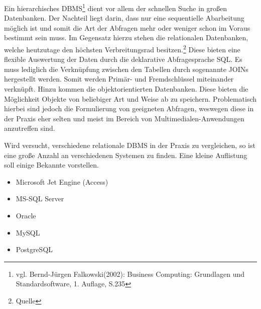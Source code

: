 Ein hierarchisches DBMS\footnote{vgl. Bernd-Jürgen Falkowski(2002): Business Computing: Grundlagen und Standardsoftware, 1. Auflage, S.235} dient vor allem der schnellen Suche in großen Datenbanken.
Der Nachteil liegt darin, dass nur eine sequentielle Abarbeitung möglich ist und somit die Art der Abfragen mehr oder weniger schon im Voraus bestimmt sein muss.
Im Gegensatz hierzu stehen die relationalen Datenbanken, welche heutzutage den höchsten Verbreitungsrad besitzen.\footnote{Quelle}
Diese bieten eine flexible Auswertung der Daten durch die deklarative Abfragesprache SQL.
Es muss lediglich die Verknüpfung zwischen den Tabellen durch sogenannte JOINs hergestellt werden. Somit werden Primär- und Fremdschlüssel miteinander verknüpft.
Hinzu kommen die objektorientierten Datenbanken. Diese bieten die Möglichkeit Objekte von beliebiger Art und Weise ab zu speichern.
Problematisch hierbei sind jedoch die Formulierung von geeigneten Abfragen, weswegen diese in der Praxis eher selten und meist im Bereich von Multimedialen-Anwendungen anzutreffen sind.%

Wird versucht, verschiedene relationale DBMS in der Praxis zu vergleichen, so ist eine große Anzahl an verschiedenen Systemen zu finden.
Eine kleine Auflistung soll einige Bekannte vorstellen.

\begin{itemize}
\item Microsoft Jet Engine (Access)
\item MS-SQL Server
\item Oracle
\item MySQL
\item PostgreSQL
\end{itemize}

